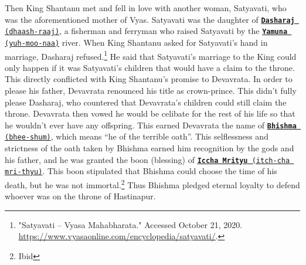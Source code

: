 \documentclass[10pt, letterpaper]{article}
\begin{document}
Then King Shantanu met and fell in love with another woman, Satyavati,
who was the aforementioned mother of Vyas. Satyavati was the daughter of
\texttt{\underline{\href{https://drive.google.com/file/d/1po7hfZ6_t0pbceKlydD69WjDzy_lgTgU/view?usp=sharing}{\textbf{Dasharaj}}
(dhaash-raaj)}}, a fisherman and ferryman who raised Satyavati by the
\texttt{\underline{\href{https://drive.google.com/file/d/11iuj4w8FPec3wsC4q4F6-noLFrrQkqlT/view?usp=sharing}{\textbf{Yamuna}}
(yuh-moo-naa)}} river. When King Shantanu asked for Satyavati's hand in
marriage, Dasharaj refused.\footnote{"Satyavati -- Vyasa Mahabharata."
  Accessed October 21, 2020.
  \href{https://www.vyasaonline.com/encyclopedia/satyavati/}{\underline{https://www.vyasaonline.com/encyclopedia/satyavati/}}.}
He said that Satyavati's marriage to the King could only happen if it
was Satyavati's children that would have a claim to the throne. This
directly conflicted with King Shantanu's promise to Devavrata. In order
to please his father, Devavrata renounced his title as crown-prince.
This didn't fully please Dasharaj, who countered that Devavrata's
children could still claim the throne. Devavrata then vowed he would be
celibate for the rest of his life so that he wouldn't ever have any
offspring. This earned Devavrata the name of
\texttt{\underline{\href{https://drive.google.com/file/d/1dqqnqVBxGQG9JxwZKFaLFkW1fR3UFZah/view?usp=sharing}{\textbf{Bhishma}}
(bhee-shum)}}, which means ``he of the terrible oath''. This selflessness
and strictness of the oath taken by Bhishma earned him recognition by
the gods and his father, and he was granted the boon (blessing) of
\texttt{\underline{\href{https://drive.google.com/file/d/1yNX--rYMGQvSF9YZfBRnt9ztgANpzUjQ/view?usp=sharing}{\textbf{Iccha
Mrityu}} (itch-cha mri-thyu)}}. This boon stipulated that Bhishma could
choose the time of his death, but he was not immortal.\footnote{Ibid}
Thus Bhishma pledged eternal loyalty to defend whoever was on the throne
of Hastinapur. \\
\end{document}
